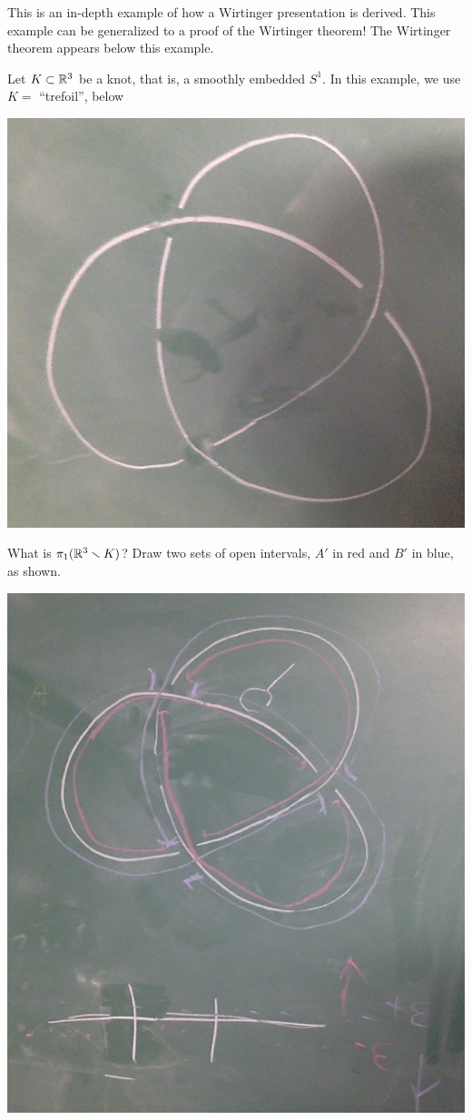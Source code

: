 \documentclass[11pt,leqno,oneside]{amsart}
\numberwithin{thm}{section}
\newcommand{\minus}{\smallsetminus}
\newcommand{\fund}[1][1]{\pi_{#1}}
\begin{document}
\begin{example}
  This is an in-depth example of how a Wirtinger presentation is
  derived.  This example can be generalized to a proof of the
  Wirtinger theorem!  The Wirtinger theorem appears below this
  example.

  Let $K \subset {\mathbb R}^3$ be a knot, that is, a smoothly embedded $S^1$.
  In this example, we use $K =$ ``trefoil'', below

  \includegraphics[scale=0.15]{images/trefoil.jpg}

  What is $\fund(\R^3\minus K)$?  Draw two sets of open intervals,
  $A'$ in red and $B'$ in blue, as shown.

  \includegraphics[scale=0.2]{images/trefoil-with-red-and-blue.jpg}


\end{example}
\end{document}

